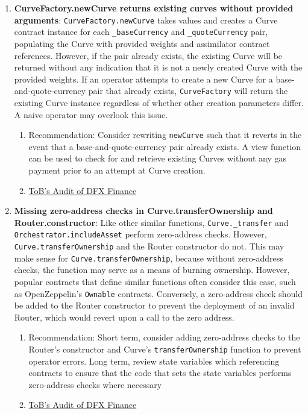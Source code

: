 \begin{enumerate}
\item\textbf{CurveFactory.newCurve returns existing curves without provided arguments}: \verb|CurveFactory.newCurve| takes values and creates a Curve contract instance for each \verb|_baseCurrency| and \verb|_quoteCurrency| pair, populating the Curve with provided weights and assimilator contract references. However, if the pair already exists, the existing Curve will be returned without any indication that it is not a newly created Curve with the provided weights. If an operator attempts to create a new Curve for a base-and-quote-currency pair that already exists, \verb|CurveFactory| will return the existing Curve instance regardless of whether other creation parameters differ. A naive operator may overlook this issue.
	\begin{enumerate}
	\item Recommendation: Consider rewriting \verb|newCurve| such that it reverts in the event that a base-and-quote-currency pair already exists. A view function can be used to check for and retrieve existing Curves without any gas payment prior to an attempt at Curve creation.
	\item\href{https://github.com/dfx-finance/protocol/blob/main/audits/2021-05-03-Trail\_of\_Bits.pdf}{ToB's Audit of DFX Finance}
	\end{enumerate}

\item\textbf{Missing zero-address checks in Curve.transferOwnership  and Router.constructor}: Like other similar functions, \verb|Curve._transfer| and \verb|Orchestrator.includeAsset| perform zero-address checks. However, \verb|Curve.transferOwnership| and the Router constructor do not. This may make sense for \verb|Curve.transferOwnership|, because without zero-address checks, the function may serve as a means of burning ownership. However, popular contracts that define similar functions often consider this case, such as OpenZeppelin’s \verb|Ownable| contracts. Conversely, a zero-address check should be added to the Router constructor to prevent the deployment of an invalid Router, which would revert upon a call to the zero address.
	\begin{enumerate}
	\item Recommendation: Short term, consider adding zero-address checks to the Router’s constructor and Curve’s \verb|transferOwnership| function to prevent operator errors. Long term, review state variables which referencing contracts to ensure that the code that sets the state variables performs zero-address checks where necessary
	\item\href{https://github.com/dfx-finance/protocol/blob/main/audits/2021-05-03-Trail\_of\_Bits.pdf}{ToB's Audit of DFX Finance}
	\end{enumerate}


\end{enumerate}
